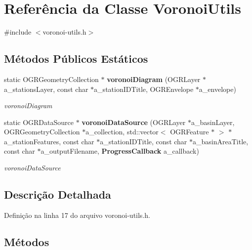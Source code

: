 \section{Referência da Classe Voronoi\+Utils}
\label{class_voronoi_utils}


{\ttfamily \#include $<$voronoi-\/utils.\+h$>$}

\subsection*{Métodos Públicos Estáticos}
\begin{DoxyCompactItemize}
\item 
static O\+G\+R\+Geometry\+Collection $\ast$ {\bf voronoi\+Diagram} (O\+G\+R\+Layer $\ast$a\+\_\+stations\+Layer, const char $\ast$a\+\_\+station\+I\+D\+Title, O\+G\+R\+Envelope $\ast$a\+\_\+envelope)
\begin{DoxyCompactList}\small\item\em voronoi\+Diagram \end{DoxyCompactList}\item 
static O\+G\+R\+Data\+Source $\ast$ {\bf voronoi\+Data\+Source} (O\+G\+R\+Layer $\ast$a\+\_\+basin\+Layer, O\+G\+R\+Geometry\+Collection $\ast$a\+\_\+collection, std\+::vector$<$ O\+G\+R\+Feature $\ast$ $>$ $\ast$a\+\_\+station\+Features, const char $\ast$a\+\_\+station\+I\+D\+Title, const char $\ast$a\+\_\+basin\+Area\+Title, const char $\ast$a\+\_\+output\+Filename, {\bf Progress\+Callback} a\+\_\+callback)
\begin{DoxyCompactList}\small\item\em voronoi\+Data\+Source \end{DoxyCompactList}\end{DoxyCompactItemize}


\subsection{Descrição Detalhada}


Definição na linha 17 do arquivo voronoi-\/utils.\+h.



\subsection{Métodos}
